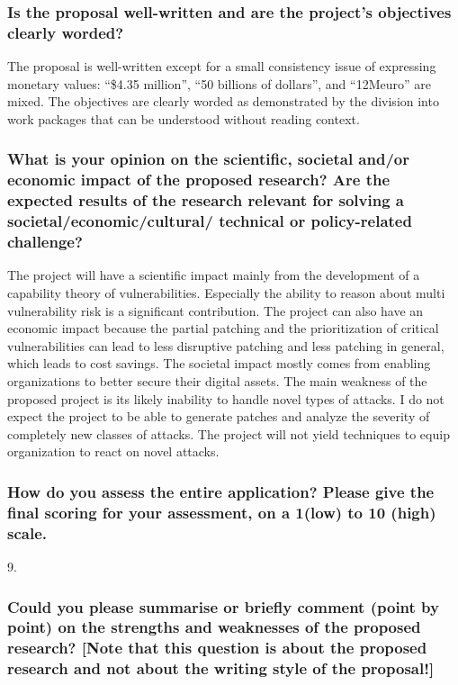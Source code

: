 \subsubsection*{Is the proposal well-written and are the project’s objectives clearly worded?}
The proposal is well-written except for a small consistency issue of expressing monetary values: ``\$4.35 million'', ``50 billions of dollars'', and ``12Meuro'' are mixed. The objectives are clearly worded as demonstrated by the division into work packages that can be understood without reading context.

\subsubsection*{What is your opinion on the scientific, societal and/or economic impact of the proposed research? Are the expected results of the research relevant for solving a societal/economic/cultural/ technical or policy-related challenge?}
The project will have a scientific impact mainly from the development of a capability theory of vulnerabilities. Especially the ability to reason about multi vulnerability risk is a significant contribution. The project can also have an economic impact because the partial patching and the prioritization of critical vulnerabilities can lead to less disruptive patching and less patching in general, which leads to cost savings. The societal impact mostly comes from enabling organizations to better secure their digital assets. The main weakness of the proposed project is its likely inability to handle novel types of attacks. I do not expect the project to be able to generate patches and analyze the severity of completely new classes of attacks. The project will not yield techniques to equip organization to react on novel attacks.

\subsubsection*{How do you assess the entire application? Please give the final scoring for your assessment, on a 1(low) to 10 (high) scale.}
9.

\subsubsection*{Could you please summarise or briefly comment (point by point) on the strengths and weaknesses of the proposed research? [Note that this question is about the proposed research and not about the writing style of the proposal!]}
